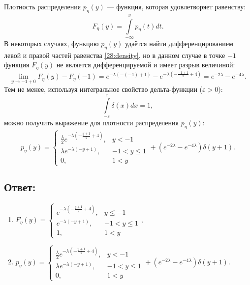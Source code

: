 \documentclass[12pt]{article}
\begin{document}
    Плотность распределения $p_\eta(y)$ --- функция,  которая удовлетворяет равенству:
    \begin{equation}
        \label{28:density}
        F_\eta(y)
        = \int \limits_{- \infty}^y p_\eta(t) dt .
    \end{equation}
    В некоторых случаях, функцию $p_\eta(y)$ удаётся найти дифференцированием левой и правой частей равенства \eqref{28:density}, но в данном случае в точке $-1$ функция
    $F_\eta(y)$ не является дифференцируемой и имеет разрыв величиной:
    \[
        \lim \limits_{y \rightarrow -1 + 0} F_\eta(y) - F_\eta(-1)
        = e^{-\lambda \left (- (-1) + 1 \right )} - e^{-\lambda \left ( - \frac{-1 + 1}{2} + 4 \right )}
        = e^{-2 \lambda} - e^{- 4 \lambda}
        .
    \]
    Тем не менее, используя интегральное свойство дельта-функции ($\varepsilon > 0$):
    \[
        \int \limits_{-\varepsilon}^{\varepsilon} \delta(x) dx = 1 ,
    \]
    можно получить выражение для плотности распределения $p_\eta(y)$:
    \[
        p_\eta(y)
        =
        \left \{
        \begin{array}{ll}
            \frac{\lambda}{2} e^{ -\lambda \left ( - \frac{y+1}{2} + 4 \right )}, & y < -1       \\
            \lambda e^{ -\lambda \left ( - y + 1 \right )},                       & -1 < y \le 1 \\
            0,                                                                    & 1 < y

        \end{array}
        \right .
        + \left ( e^{-2 \lambda} - e^{- 4 \lambda} \right ) \delta(y+1)
        .
    \]

    \subsection*{Ответ:}
    \begin{enumerate}
        \item
        $
        F_\eta(y)
        =
        \left \{
        \begin{array}{ll}
            e^{ -\lambda \left ( - \frac{y+1}{2} + 4 \right )}, & y \le -1     \\
            e^{ -\lambda \left ( - y + 1 \right )},             & -1 < y \le 1 \\
            1,                                                  & 1 < y
        \end{array}
        \right . ,
        $
        \item
        $
        p_\eta(y)
        =
        \left \{
        \begin{array}{ll}
            \frac{\lambda}{2} e^{ -\lambda \left ( - \frac{y+1}{2} + 4 \right )}, & y < -1       \\
            \lambda e^{ -\lambda \left ( - y + 1 \right )},                       & -1 < y \le 1 \\
            0,                                                                    & 1 < y

        \end{array}
        \right .
        + \left ( e^{-2 \lambda} - e^{- 4 \lambda} \right ) \delta(y+1)
        .
        $
    \end{enumerate}
\end{document}
